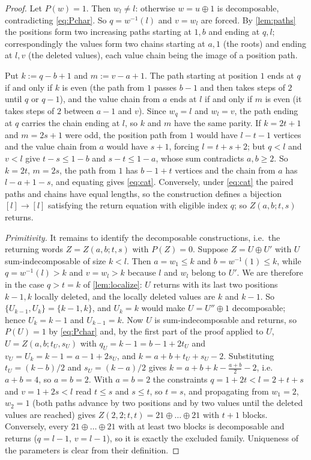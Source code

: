 \documentclass[11pt,reqno]{amsart}
\theoremstyle{plain}
\theoremstyle{definition}
\theoremstyle{remark}
\begin{document}
\begin{proof}
Let $P(w)=1$. Then $w_l\ne l$: otherwise $w=u\oplus1$ is decomposable, contradicting \eqref{eq:Pchar}. So $q=w^{-1}(l)$ and $v=w_l$ are forced. By \cref{lem:paths} the positions form two increasing paths starting at $1,b$ and ending at $q,l$; correspondingly the values form two chains starting at $a,1$ (the roots) and ending at $l,v$ (the deleted values), each value chain being the image of a position path. 

Put $k:=q-b+1$ and $m:=v-a+1$. The path starting at position $1$ ends at $q$ if and only if $k$ is even (the path from $1$ passes $b-1$ and then takes steps of $2$ until $q$ or $q-1$), and the value chain from $a$ ends at $l$ if and only if $m$ is even (it takes steps of $2$ between $a-1$ and $v$). Since $w_q=l$ and $w_l=v$, the path ending at $q$ carries the chain ending at $l$, so $k$ and $m$ have the same parity. If $k=2t+1$ and $m=2s+1$ were odd, the position path from $1$ would have $l-t-1$ vertices and the value chain from $a$ would have $s+1$, forcing $l=t+s+2$; but $q<l$ and $v<l$ give $t-s\le1-b$ and $s-t\le1-a$, whose sum contradicts $a,b\ge2$. So $k=2t$, $m=2s$, the path from $1$ has $b-1+t$ vertices and the chain from $a$ has $l-a+1-s$, and equating gives \eqref{eq:cat}. Conversely, under \eqref{eq:cat} the paired paths and chains have equal lengths, so the construction defines a bijection $[l]\to[l]$ satisfying the return equation with eligible index $q$; so $Z(a,b;t,s)$ returns. 

\emph{Primitivity.} It remains to identify the decomposable constructions, i.e.\ the returning words $Z=Z(a,b;t,s)$ with $P(Z)=0$. Suppose $Z=U\oplus U'$ with $U$ sum-indecomposable of size $k<l$. Then $a=w_1\le k$ and $b=w^{-1}(1)\le k$, while $q=w^{-1}(l)>k$ and $v=w_l>k$ because $l$ and $w_l$ belong to $U'$. We are therefore in the case $q>t=k$ of \cref{lem:localize}: $U$ returns with its last two positions $k-1,k$ locally deleted, and the locally deleted values are $k$ and $k-1$. So $\{U_{k-1},U_k\}=\{k-1,k\}$, and $U_k=k$ would make $U=U''\oplus1$ decomposable; hence $U_k=k-1$ and $U_{k-1}=k$. Now $U$ is sum-indecomposable and returns, so $P(U)=1$ by \eqref{eq:Pchar} and, by the first part of the proof applied to $U$, $U=Z(a,b;t_U,s_U)$ with $q_U=k-1=b-1+2t_U$ and $v_U=U_k=k-1=a-1+2s_U$, and $k=a+b+t_U+s_U-2$. Substituting $t_U=(k-b)/2$ and $s_U=(k-a)/2$ gives $k=a+b+k-\frac{a+b}2-2$, i.e.\ $a+b=4$, so $a=b=2$. With $a=b=2$ the constraints $q=1+2t<l=2+t+s$ and $v=1+2s<l$ read $t\le s$ and $s\le t$, so $t=s$, and propagating from $w_1=2$, $w_2=1$ (both paths advance by two positions and by two values until the deleted values are reached) gives $Z(2,2;t,t)=21\oplus\dots\oplus21$ with $t+1$ blocks. Conversely, every $21\oplus\dots\oplus21$ with at least two blocks is decomposable and returns ($q=l-1$, $v=l-1$), so it is exactly the excluded family. Uniqueness of the parameters is clear from their definition.
\end{proof}
\end{document}
